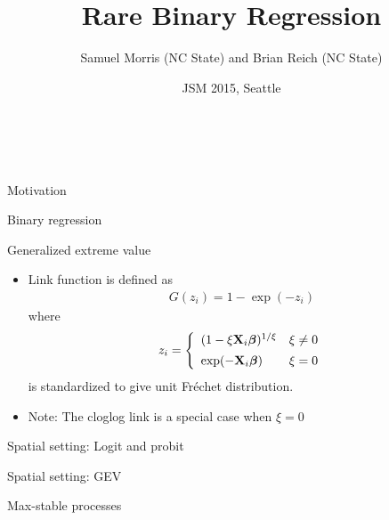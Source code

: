 \documentclass{beamer}
\title[Rare Binary Regression] %
{
  Rare Binary Regression
}
\author[S. Morris and B. Reich]{Samuel Morris (NC State) and Brian Reich (NC State)}
\institute[NCSU]{}
\date{JSM 2015, Seattle}
\begin{document}
\begin{frame}\frametitle{\ }
\begin{center}
	\maketitle
\end{center}
\end{frame}

\begin{frame}{Motivation}
\end{frame}

\begin{frame}{Binary regression}
\end{frame}

\begin{frame}{Generalized extreme value}
\begin{itemize} \setlength{\itemsep}{1em}
  \item Link function is defined as
  \begin{align*}
    G(z_i) = 1 - \exp(-z_i)
  \end{align*}
  where
  \begin{align*}
    z_i = \left\{ \begin{array}{ll}
      (1 - \xi \mbox{\bf X}_i \mbox{\boldmath $\beta$})^{1 / \xi} & \xi \neq 0 \\[0.5em]
      \exp(-\mbox{\bf X}_i \mbox{\boldmath $\beta$}) & \xi = 0
      \end{array} \right.
  \end{align*}
  is standardized to give unit Fr\'{e}chet distribution.
  \item Note: The cloglog link is a special case when $\xi = 0$
\end{itemize}
\end{frame}

\begin{frame}{Spatial setting: Logit and probit}
\end{frame}

\begin{frame}{Spatial setting: GEV}
\end{frame}

\begin{frame}{Max-stable processes}
\end{frame}
\end{document}
